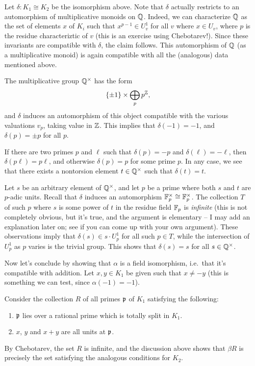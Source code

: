Let $\delta : K_{1} \cong K_{2}$ be the isomorphism above.
Note that $\delta$ actually restricts to an automorphism of multiplicative monoids on $\mathbb{Q}$.
Indeed, we can characterize $\mathbb{Q}$ as the set of elements $x$ of $K_{i}$ such that $x^{p-1} \in U_{v}^{1}$ for all $v$ where $x \in U_{v}$, where $p$ is the residue characteriztic of $v$ (this is an exercise using Chebotarev!).
Since these invariants are compatible with $\delta$, the claim follows.
This automorphism of $\mathbb{Q}$ (as a multiplicative monoid) is again compatible with all the (analogous) data mentioned above.

The multiplicative group $\mathbb{Q}^{\times}$ has the form
\[ \{\pm 1\} \times \bigoplus_{p} p^{\mathbb{Z}}, \]
and $\delta$ induces an automorphism of this object compatible with the various valuations $v_{p}$, taking value in $\mathbb{Z}$.
This implies that $\delta(-1) = -1$, and $\delta(p) = \pm p$ for all $p$.

If there are two primes $p$ and $\ell$ such that $\delta(p) = -p$ and $\delta(\ell) = -\ell$, then $\delta(p\ell) = p\ell$, and otherwise $\delta(p) = p$ for some prime $p$.
In any case, we see that there exists a nontorsion element $t \in \mathbb{Q}^{\times}$ such that $\delta(t) = t$.

Let $s$ be an arbitrary element of $\mathbb{Q}^{\times}$, and let $p$ be a prime where both $s$ and $t$ are $p$-adic units.
Recall that $\delta$ induces an automorphism $\mathbb{F}_{p}^{\times} \cong \mathbb{F}_{p}^{\times}$.
The collection $T$ of such $p$ where $s$ is some power of $t$ in the residue field $\mathbb{F}_{p}$ is \emph{infinite} (this is not completely obvious, but it's true, and the argument is elementary -- I may add an explanation later on; see if you can come up with your own argument).
These observations imply that $\delta(s) \in s \cdot U_{p}^{1}$ for all such $p \in T$, while the intersection of $U_{p}^{1}$ as $p$ varies is the trivial group.
This shows that $\delta(s) = s$ for all $s \in \mathbb{Q}^{\times}$.

Now let's conclude by showing that $\alpha$ is a field isomorphism, i.e.~that it's compatible with addition.
Let $x,y \in K_{1}$ be given such that $x \neq -y$ (this is something we can test, since $\alpha(-1) = -1$).

Consider the collection $R$ of all primes $\mathfrak{p}$ of $K_{1}$ satisfying the following:
\begin{enumerate}
  \item $\mathfrak{p}$ lies over a rational prime which is totally split in $K_{1}$.
  \item $x$, $y$ and $x+y$ are all units at $\mathfrak{p}$.
\end{enumerate}
By Chebotarev, the set $R$ is infinite, and the discussion above shows that $\beta R$ is precisely the set satisfying the analogous conditions for $K_{2}$.


